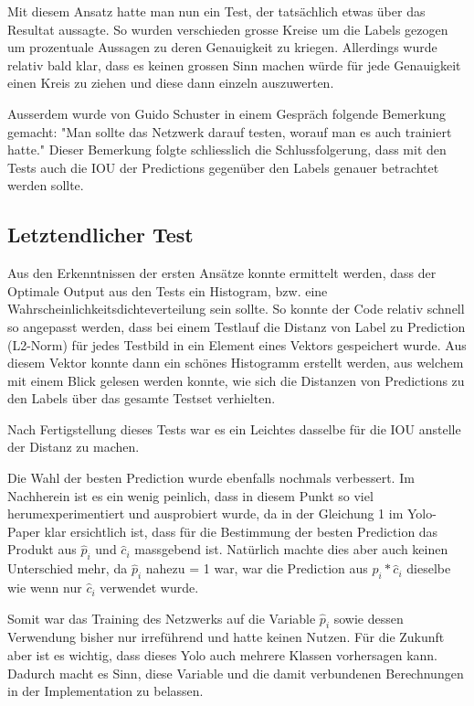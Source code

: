 Mit diesem Ansatz hatte man nun ein Test, der tatsächlich etwas über das Resultat aussagte. 
So wurden verschieden grosse Kreise um die Labels gezogen um prozentuale Aussagen zu deren Genauigkeit zu kriegen.
Allerdings wurde relativ bald klar, dass es keinen grossen Sinn machen würde für jede Genauigkeit einen Kreis zu ziehen und diese dann einzeln auszuwerten.

Ausserdem wurde von Guido Schuster \cite{PrivateCommunication} in einem Gespräch folgende Bemerkung gemacht:
"Man sollte das Netzwerk darauf testen, worauf man es auch trainiert hatte."
Dieser Bemerkung folgte schliesslich die Schlussfolgerung, dass mit den Tests auch die IOU der Predictions gegenüber den Labels genauer betrachtet werden sollte.

\subsection{Letztendlicher Test}
\label{chapter:letztendlicher_test}
Aus den Erkenntnissen der ersten Ansätze konnte ermittelt werden, dass der Optimale Output aus den Tests ein Histogram, bzw. eine Wahrscheinlichkeitsdichteverteilung sein sollte.
So konnte der Code relativ schnell so angepasst werden, dass bei einem Testlauf die Distanz von Label zu Prediction (L2-Norm) für jedes Testbild in ein Element eines Vektors gespeichert wurde.
Aus diesem Vektor konnte dann ein schönes Histogramm erstellt werden, aus welchem mit einem Blick gelesen werden konnte, wie sich die Distanzen von Predictions zu den Labels über das gesamte Testset verhielten.

Nach Fertigstellung dieses Tests war es ein Leichtes dasselbe für die IOU anstelle der Distanz zu machen. 

Die Wahl der besten Prediction wurde ebenfalls nochmals verbessert.
Im Nachherein ist es ein wenig peinlich, dass in diesem Punkt so viel herumexperimentiert und ausprobiert wurde, da in der Gleichung 1 im Yolo-Paper \cite{yolo} klar ersichtlich ist, dass für die Bestimmung der besten Prediction das Produkt aus $\hat{p}_i$ und $\hat{c}_i$ massgebend ist.
Natürlich machte dies aber auch keinen Unterschied mehr, da $\hat{p}_i$ nahezu = 1 war, war die Prediction aus $\hat{p}_i * \hat{c}_i$ dieselbe wie wenn nur $\hat{c}_i$ verwendet wurde.

Somit war das Training des Netzwerks auf die Variable $\hat{p}_i$ sowie dessen Verwendung bisher nur irreführend und hatte keinen Nutzen.
Für die Zukunft aber ist es wichtig, dass dieses Yolo auch mehrere Klassen vorhersagen kann.
Dadurch macht es Sinn, diese Variable und die damit verbundenen Berechnungen in der Implementation zu belassen. 

